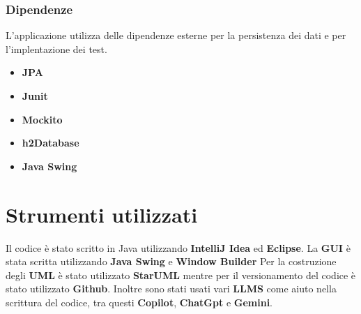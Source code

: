 \subsubsection{Dipendenze}
L'applicazione utilizza delle dipendenze esterne per la persistenza dei dati e per
l'implentazione dei test.
\begin{itemize}
    \item \textbf{JPA}
    \item \textbf{Junit}
    \item \textbf{Mockito}
    \item \textbf{h2Database}
    \item \textbf{Java Swing}
\end{itemize}
\section{Strumenti utilizzati}
Il codice è stato scritto in Java utilizzando \textbf{IntelliJ Idea} ed \textbf{Eclipse}.
La \textbf{GUI} è stata scritta utilizzando \textbf{Java Swing} e \textbf{Window Builder} 
Per la costruzione degli \textbf{UML} è stato utilizzato \textbf{StarUML} mentre per il versionamento
del codice è stato utilizzato \textbf{Github}. Inoltre sono stati usati vari \textbf{LLMS} come 
aiuto nella scrittura del codice, tra questi \textbf{Copilot}, \textbf{ChatGpt} e \textbf{Gemini}.